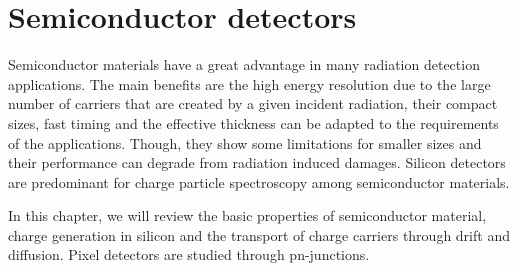\chapter{Semiconductor detectors}
\label{sec:SiliconTheory}

Semiconductor materials have a great advantage in many radiation
detection applications. The main benefits are the high energy
resolution due to the large number of carriers that are created by a
given incident radiation, their compact sizes, fast timing and the
effective thickness can be adapted to the requirements of the
applications. Though, they show some limitations for smaller sizes and
their performance can degrade from radiation induced damages. Silicon
detectors are predominant for charge particle spectroscopy among
semiconductor materials.

In this chapter, we will review the basic properties of semiconductor
material, charge generation in silicon and the transport of charge
carriers through drift and diffusion. Pixel detectors are studied
through pn-junctions. 


